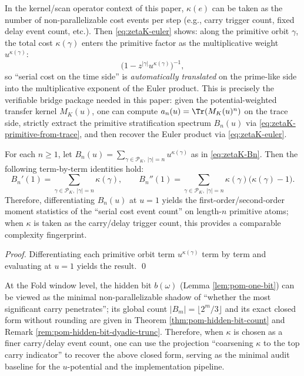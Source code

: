 \begin{remark}\label{rem:zetaK-u-delay}
In the kernel/scan operator context of this paper, \(\kappa(e)\) can be taken as the number of non-parallelizable cost events per step (e.g., carry trigger count, fixed delay event count, etc.). Then \eqref{eq:zetaK-euler} shows: along the primitive orbit \(\gamma\), the total cost \(\kappa(\gamma)\) enters the primitive factor as the multiplicative weight \(u^{\kappa(\gamma)}\):
\[
\bigl(1-z^{|\gamma|}u^{\kappa(\gamma)}\bigr)^{-1},
\]
so ``serial cost on the time side'' is \emph{automatically translated} on the prime-like side into the multiplicative exponent of the Euler product.
This is precisely the verifiable bridge package needed in this paper: given the potential-weighted transfer kernel \(M_K(u)\), one can compute \(a_n(u)=\Tr(M_K(u)^n)\) on the trace side, strictly extract the primitive stratification spectrum \(B_n(u)\) via \eqref{eq:zetaK-primitive-from-trace}, and then recover the Euler product via \eqref{eq:zetaK-euler}.
\end{remark}

\begin{corollary}\label{cor:zetaK-primitive-moments}
For each \(n\ge 1\), let
\(
B_n(u)=\sum_{\gamma\in\mathcal{P}_K,\ |\gamma|=n} u^{\kappa(\gamma)}
\)
as in \eqref{eq:zetaK-Bn}.
Then the following term-by-term identities hold:
\[
\boxed{\;
B_n'(1)=\sum_{\gamma\in\mathcal{P}_K,\ |\gamma|=n}\kappa(\gamma),\qquad
B_n''(1)=\sum_{\gamma\in\mathcal{P}_K,\ |\gamma|=n}\kappa(\gamma)\bigl(\kappa(\gamma)-1\bigr).\;}
\]
Therefore, differentiating \(B_n(u)\) at \(u=1\) yields the first-order/second-order moment statistics of the ``serial cost event count'' on length-\(n\) primitive atoms; when \(\kappa\) is taken as the carry/delay trigger count, this provides a comparable complexity fingerprint.
\end{corollary}
\begin{proof}
Differentiating each primitive orbit term \(u^{\kappa(\gamma)}\) term by term and evaluating at \(u=1\) yields the result. \qed
\end{proof}

\begin{remark}\label{rem:zetaK-overflow-calibration}
At the Fold window level, the hidden bit \(b(\omega)\) (Lemma \ref{lem:pom-one-bit}) can be viewed as the minimal non-parallelizable shadow of ``whether the most significant carry penetrates'';
its global count \(|B_m|=\lfloor 2^m/3\rfloor\) and its exact closed form without rounding are given in Theorem \ref{thm:pom-hidden-bit-count} and Remark \ref{rem:pom-hidden-bit-dyadic-trunc}.
Therefore, when \(\kappa\) is chosen as a finer carry/delay event count, one can use the projection ``coarsening \(\kappa\) to the top carry indicator'' to recover the above closed form, serving as the minimal audit baseline for the \(u\)-potential and the implementation pipeline.
\end{remark}


